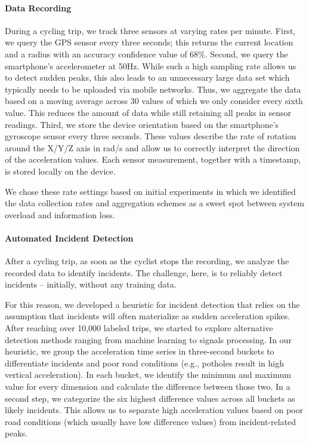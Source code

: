 \paragraph{Data Recording}
During a cycling trip, we track three sensors at varying rates per minute.
First, we query the GPS sensor every three seconds; this returns the current location and a radius with an accuracy confidence value of 68\%.
Second, we query the smartphone's accelerometer at 50Hz.
While such a high sampling rate allows us to detect sudden peaks, this also leads to an unnecessary large data set which typically needs to be uploaded via mobile networks.
Thus, we aggregate the data based on a moving average across 30 values of which we only consider every sixth value.
This reduces the amount of data while still retaining all peaks in sensor readings.
Third, we store the device orientation based on the smartphone's gyroscope sensor every three seconds.
These values describe the rate of rotation around the X/Y/Z axis in rad/s and allow us to correctly interpret the direction of the acceleration values.
Each sensor measurement, together with a timestamp, is stored locally on the device.

We chose these rate settings based on initial experiments in which we identified the data collection rates and aggregation schemes as a sweet spot between system overload and information loss.



\paragraph{Automated Incident Detection}
After a cycling trip, as soon as the cyclist stops the recording, we analyze the recorded data to identify incidents.
The challenge, here, is to reliably detect incidents -- initially, without any training data.

For this reason, we developed a heuristic for incident detection that relies on the assumption that incidents will often materialize as sudden acceleration spikes.
After reaching over 10,000 labeled trips, we started to explore alternative detection methods ranging from machine learning to signals processing.
In our heuristic, we group the acceleration time series in three-second buckets to differentiate incidents and poor road conditions (e.g., potholes result in high vertical acceleration).
In each bucket, we identify the minimum and maximum value for every dimension and calculate the difference between those two.
In a second step, we categorize the six highest difference values across all buckets as likely incidents.
This allows us to separate high acceleration values based on poor road conditions (which usually have low difference values) from incident-related peaks.

